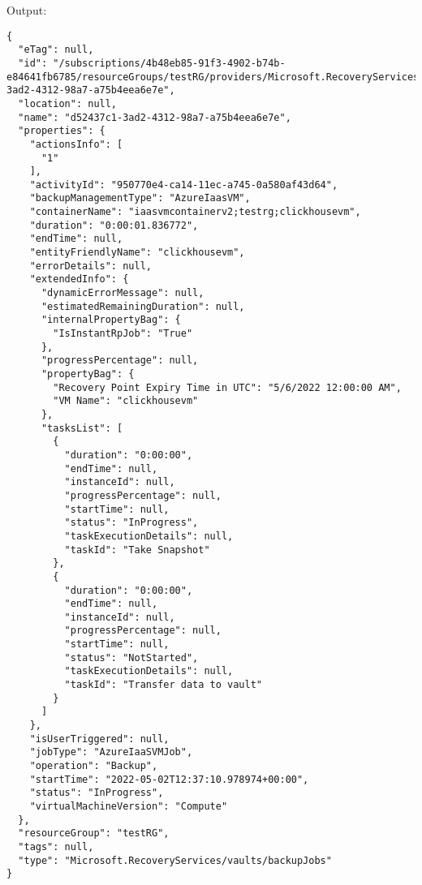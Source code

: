 Output:
\begin{verbatim}
{
  "eTag": null,
  "id": "/subscriptions/4b48eb85-91f3-4902-b74b-e84641fb6785/resourceGroups/testRG/providers/Microsoft.RecoveryServices/vaults/myRSV/backupJobs/d52437c1-3ad2-4312-98a7-a75b4eea6e7e",
  "location": null,
  "name": "d52437c1-3ad2-4312-98a7-a75b4eea6e7e",
  "properties": {
    "actionsInfo": [
      "1"
    ],
    "activityId": "950770e4-ca14-11ec-a745-0a580af43d64",
    "backupManagementType": "AzureIaasVM",
    "containerName": "iaasvmcontainerv2;testrg;clickhousevm",
    "duration": "0:00:01.836772",
    "endTime": null,
    "entityFriendlyName": "clickhousevm",
    "errorDetails": null,
    "extendedInfo": {
      "dynamicErrorMessage": null,
      "estimatedRemainingDuration": null,
      "internalPropertyBag": {
        "IsInstantRpJob": "True"
      },
      "progressPercentage": null,
      "propertyBag": {
        "Recovery Point Expiry Time in UTC": "5/6/2022 12:00:00 AM",
        "VM Name": "clickhousevm"
      },
      "tasksList": [
        {
          "duration": "0:00:00",
          "endTime": null,
          "instanceId": null,
          "progressPercentage": null,
          "startTime": null,
          "status": "InProgress",
          "taskExecutionDetails": null,
          "taskId": "Take Snapshot"
        },
        {
          "duration": "0:00:00",
          "endTime": null,
          "instanceId": null,
          "progressPercentage": null,
          "startTime": null,
          "status": "NotStarted",
          "taskExecutionDetails": null,
          "taskId": "Transfer data to vault"
        }
      ]
    },
    "isUserTriggered": null,
    "jobType": "AzureIaaSVMJob",
    "operation": "Backup",
    "startTime": "2022-05-02T12:37:10.978974+00:00",
    "status": "InProgress",
    "virtualMachineVersion": "Compute"
  },
  "resourceGroup": "testRG",
  "tags": null,
  "type": "Microsoft.RecoveryServices/vaults/backupJobs"
}
\end{verbatim}
